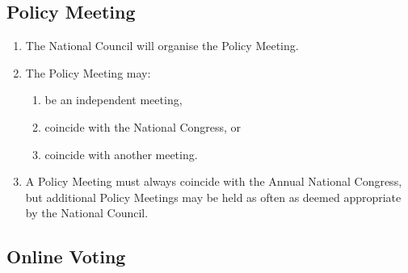 \documentclass[a4paper,titlepage,8.5pt]{article}
\begin{document}
\subsection{Policy Meeting}

\begin{enumerate}
\item The National Council will organise the Policy Meeting.
\item The Policy Meeting may:
\begin{enumerate}
\item be an independent meeting, 
\item coincide with the National Congress, or 
\item coincide with another meeting.
\end{enumerate}
\item A Policy Meeting must always coincide with the Annual National Congress, but additional Policy Meetings may be held as often as deemed appropriate by the National Council.
\end{enumerate}

\subsection{Online Voting}
\end{document}
